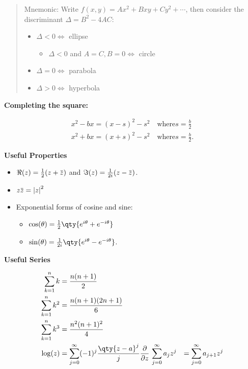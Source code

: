 \begin{quote}
Mnemonic: Write \(f(x, y) = Ax^2 + Bxy + Cy^2 + \cdots\), then consider
the discriminant \(\Delta = B^2 - 4AC\):

\begin{itemize}
\tightlist
\item
  \(\Delta < 0 \iff\) ellipse

  \begin{itemize}
  \tightlist
  \item
    \(\Delta < 0\) and \(A=C, B=0 \iff\) circle
  \end{itemize}
\item
  \(\Delta = 0 \iff\) parabola
\item
  \(\Delta > 0 \iff\) hyperbola
\end{itemize}
\end{quote}

\textbf{Completing the square:}

\begin{align*}
x^2 - bx = (x - s)^2 - s^2 \quad\text{where} s = \frac{b}{2} \\
x^2 + bx = (x + s)^2 - s^2 \quad\text{where} s = \frac{b}{2}
.\end{align*}

\textbf{Useful Properties}

\begin{itemize}
\tightlist
\item
  \(\Re(z) = \frac 1 2 (z + \mkern 1.5mu\overline{\mkern-1.5muz\mkern-1.5mu}\mkern 1.5mu)\)
  and
  \(\Im(z) = \frac{1}{2i}(z - \mkern 1.5mu\overline{\mkern-1.5muz\mkern-1.5mu}\mkern 1.5mu)\).
\item
  \(z\mkern 1.5mu\overline{\mkern-1.5muz\mkern-1.5mu}\mkern 1.5mu = {\left\lvert {z} \right\rvert}^2\)
\item
  Exponential forms of cosine and sine:

  \begin{itemize}
  \tightlist
  \item
    \(\cos(\theta) = \frac 1 2 \qty{e^{i\theta} + e^{-i\theta}}\)
  \item
    \(\sin(\theta) = \frac{1}{2i}\qty{e^{i\theta} - e^{-i\theta}}\).
  \end{itemize}
\end{itemize}

\textbf{Useful Series}

\begin{align*}
\sum_{k=1}^{n} k &=\frac{n(n+1)}{2} \\
\sum_{k=1}^{n} k^{2} &=\frac{n(n+1)(2 n+1)}{6} \\
\sum_{k=1}^{n} k^{3} &=\frac{n^{2}(n+1)^{2}}{4}  \\
\log(z) &= \sum_{j=0}^\infty (-1)^j \frac{\qty{z-a}^j}{j}
{\frac{\partial }{\partial z}\,} \sum_{j=0}^\infty a_j z^j &= \sum_{j=0}^\infty a_{j+1}z^j
\end{align*}

